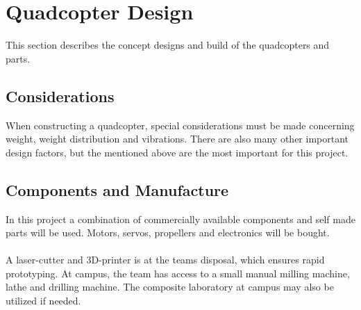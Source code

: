 \section{Quadcopter Design}
This section describes the concept designs and build of the quadcopters and parts. 

\subsection{Considerations}
When constructing a quadcopter, special considerations must be made concerning weight, weight distribution and vibrations. There are also many other important design factors, but the mentioned above are the most important for this project.  

\subsection{Components and Manufacture}
In this project a combination of commercially available components and self made parts will be used. Motors, servos, propellers and electronics will be bought.
\\\\
A laser-cutter and 3D-printer is at the teams disposal, which ensures rapid prototyping. At campus, the team has access to a small manual milling machine, lathe and drilling machine. The composite laboratory at campus may also be utilized if needed.

